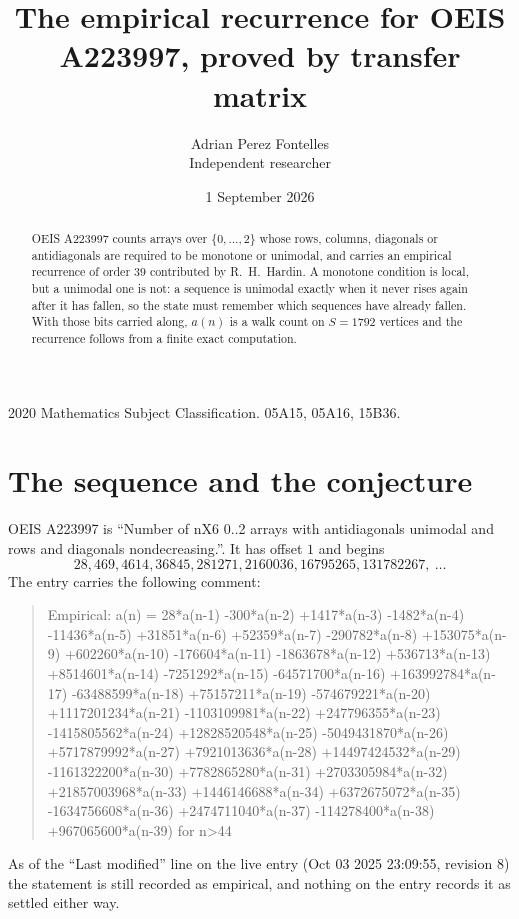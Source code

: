 \documentclass[11pt,a4paper]{article}
\title{The empirical recurrence for OEIS A223997, proved by transfer matrix}
\author{Adrian Perez Fontelles\\ \small Independent researcher}
\date{1 September 2026}
\theoremstyle{plain}
\theoremstyle{definition}
\begin{document}
\maketitle

\begin{abstract}
OEIS A223997 counts arrays over $\{0,\dots,2\}$ whose rows, columns, diagonals or
antidiagonals are required to be monotone or unimodal, and carries an empirical recurrence of
order $39$ contributed by R.~H.~Hardin. A monotone condition is local, but a unimodal one
is not: a sequence is unimodal exactly when it never rises again after it has fallen, so the
state must remember which sequences have already fallen. With those bits carried along, $a(n)$
is a walk count on $S=1792$ vertices and the recurrence follows from a finite exact
computation.
\end{abstract}

\noindent\small 2020 Mathematics Subject Classification. 05A15, 05A16, 15B36.\normalsize

\section{The sequence and the conjecture}

OEIS A223997 is ``Number of nX6 0..2 arrays with antidiagonals unimodal and rows and diagonals nondecreasing.''. It has offset $1$ and begins
\[
28, 469, 4614, 36845, 281271, 2160036, 16795265, 131782267,\ \dots
\]
The entry carries the following comment:
\begin{quote}\small
Empirical: a(n) = 28*a(n-1) -300*a(n-2) +1417*a(n-3) -1482*a(n-4) -11436*a(n-5) +31851*a(n-6) +52359*a(n-7) -290782*a(n-8) +153075*a(n-9) +602260*a(n-10) -176604*a(n-11) -1863678*a(n-12) +536713*a(n-13) +8514601*a(n-14) -7251292*a(n-15) -64571700*a(n-16) +163992784*a(n-17) -63488599*a(n-18) +75157211*a(n-19) -574679221*a(n-20) +1117201234*a(n-21) -1103109981*a(n-22) +247796355*a(n-23) -1415805562*a(n-24) +12828520548*a(n-25) -5049431870*a(n-26) +5717879992*a(n-27) +7921013636*a(n-28) +14497424532*a(n-29) -1161322200*a(n-30) +7782865280*a(n-31) +2703305984*a(n-32) +21857003968*a(n-33) +1446146688*a(n-34) +6372675072*a(n-35) -1634756608*a(n-36) +2474711040*a(n-37) -114278400*a(n-38) +967065600*a(n-39) for n>44
\end{quote}
As of the ``Last modified'' line on the live entry (Oct 03 2025 23:09:55, revision 8) the statement is
still recorded as empirical, and nothing on the entry records it as settled either way.
\end{document}
